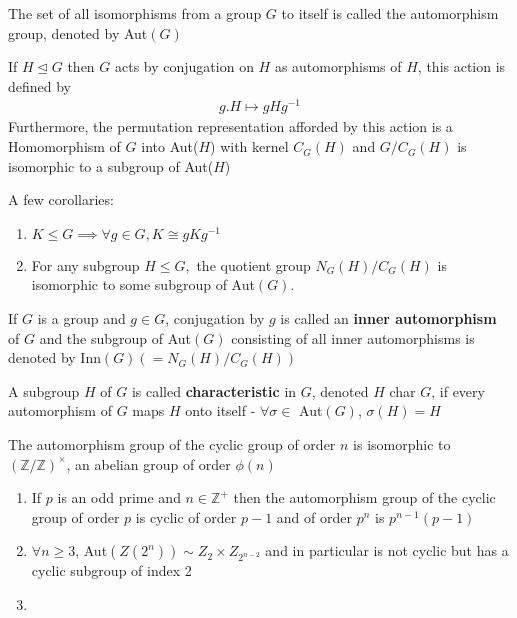 \documentclass[titlepage, 12pt]{article}
\begin{document}
\begin{definition}{}{}
    The set of all isomorphisms from a group $G$ to itself is called the
    automorphism group, denoted by Aut$(G)$
\end{definition}

\begin{proposition}{}{}
    If $H\trianglelefteq G$ then $G$ acts by conjugation on $H$ as automorphisms
    of $H$, this action is defined by
    \begin{gather*}
        g.H\mapsto gHg^{-1}
    \end{gather*}
    Furthermore, the permutation representation afforded by this action is a
    Homomorphism of $G$ into Aut($H$) with kernel $C_G(H)$ and $G/C_G(H)$ is
    isomorphic to a subgroup of Aut($H$)
\end{proposition}
A few corollaries:
\begin{enumerate}
    \item $K\leq G\implies\forall g\in G, K\cong gKg^{-1}$
    \item For any subgroup $H\leq G,$ the quotient group $N_G(H)/C_G(H)$ is
        isomorphic to some subgroup of Aut$(G)$.
\end{enumerate}

\begin{definition}{}{}
    If $G$ is a group and $g\in G$, conjugation by $g$ is called an
    \textbf{inner automorphism} of $G$ and the subgroup of Aut$(G)$ consisting
    of all inner automorphisms is denoted by Inn$(G) (= N_G(H)/C_G(H))$
\end{definition}


\begin{definition}{}{}
    A subgroup $H$ of $G$ is called \textbf{characteristic} in $G$, denoted $H$
    char $G$, if every automorphism of $G$ maps $H$ onto itself -
    $\forall\sigma\in$ Aut$(G)$, $\sigma(H) = H$
\end{definition}

\begin{proposition}{}{}
    The automorphism group of the cyclic group of order $n$ is isomorphic to
    $(\mathbb{Z}/\mathbb{Z})^\times$, an abelian group of order $\phi(n)$
\end{proposition}

\begin{proposition}{}{}
    \begin{enumerate}
        \item If $p$ is an odd prime and $n\in\mathbb{Z}^+$ then the
            automorphism group of the cyclic group of order $p$ is cyclic of
            order $p-1$ and of order $p^n$ is $p^{n-1}(p-1)$
        \item $\forall n\geq 3$, Aut$(Z(2^n))\sim Z_2\times Z_{2^{n-2}}$ and in
            particular is not cyclic but has a cyclic subgroup of index 2
        \item 
    \end{enumerate}
\end{proposition}
\end{document}
